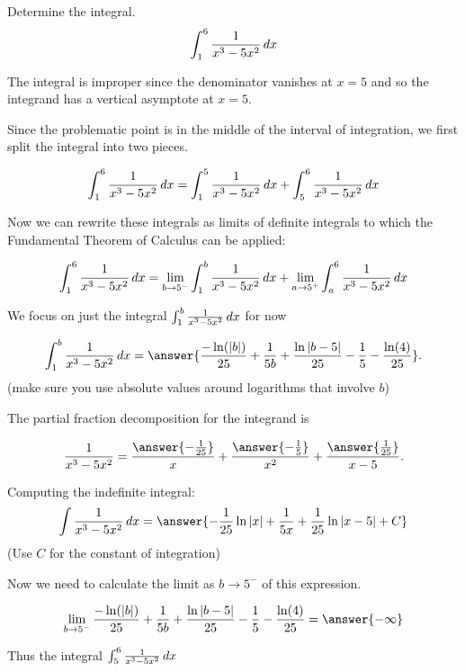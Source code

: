 \documentclass{ximera}
\author{Jason Miller}
\begin{document}
\begin{exercise}
Determine the integral.
\[
\int_{1}^{6} \frac{1}{x^3-5x^2} \mathop{}\!d x
\]

The integral is improper since the denominator vanishes at $x=5$ and so the integrand has a vertical asymptote at $x=5$. 

Since the problematic point is in the middle of the interval of integration, we first split the integral into two pieces. 

\[
\int _{1}^{6} \frac{1}{x^3-5x^2} \mathop{}\!d x=\int_{1}^{5} \frac{1}{x^3-5x^2} \mathop{}\!d x + \int_{5}^{6} \frac{1}{x^3-5x^2} \mathop{}\!d x
\]

Now we can rewrite these integrals as limits of definite integrals to which the Fundamental Theorem of Calculus can be applied: 

\[
\int_{1}^{6} \frac{1}{x^3-5x^2} \mathop{}\!d x= \lim_{b \to 5^{-}} \int_{1}^{b} \frac{1}{x^3-5x^2} \mathop{}\!d x + \lim_{a \to 5^{+}} \int _{a}^{6} 
\frac{1}{x^3-5x^2} \mathop{}\!d x
\]


We focus on just the integral $\int_{1}^{b} \frac{1}{x^3-5x^2} \mathop{}\!d x$ for now

\[
\int_{1}^{b} \frac{1}{x^3-5x^2} \d x=\answer{  \frac{-\ln(|b|)}{25} +\frac{1}{5b} + \frac{\ln|b-5|}{25}-\frac{1}{5}-\frac{\ln(4)}{25}  }.
\]
(make sure you use absolute values around logarithms that involve $b$)

\begin{hint}
The partial fraction decomposition for the integrand is

\[
\frac{1}{x^3-5x^2} = \frac{\answer{-\frac{1}{25}}}{x}+ \frac{\answer{-\frac{1}{5}}}{x^2}+\frac{\answer{\frac{1}{25}}}{x-5}.
\]
\begin{question}
Computing the indefinite integral:
\[
\int \frac{1}{x^3-5x^2} \d x = \answer{-\frac{1}{25} \ln|x| + \frac{1}{5x} +\frac{1}{25} \ln|x-5|+C}
\]
(Use $C$ for the constant of integration)
\end{question}
\end{hint}

\begin{exercise}
Now we need to calculate the limit as $b \to 5^{-}$ of this expression. 

\[
\lim_{b \to 5^{-}}  \frac{-\ln(|b|)}{25} +\frac{1}{5b} + \frac{\ln|b-5|}{25}-\frac{1}{5}-\frac{\ln(4)}{25} =\answer{ -\infty}
\]

\begin{exercise}
Thus the integral $\int_{5}^{6} \frac{1}{x^3-5x^2} \mathop{}\!d x$

\begin{multipleChoice}
\end{multipleChoice}


\end{exercise}
\end{exercise}
\end{exercise}
\end{document}
